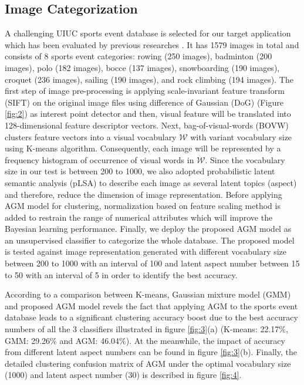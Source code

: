 \documentclass[conference]{IEEEtran}
\begin{document}
\subsection{Image Categorization}
%




A challenging UIUC sports event database\cite{Li2007} is selected for our target application which has been evaluated by previous researches \cite{Najar2018} \cite{Fan2011a}. It has 1579 images in total and consists of 8 sports event categories: rowing (250 images), badminton (200 images), polo (182 images), bocce (137 images), snowboarding (190 images), croquet (236 images), sailing (190 images), and rock climbing (194 images). The first step of image pre-processing is applying scale-invariant feature transform (SIFT) on the original image files using difference of Gaussian (DoG) \cite{Lowe1999} (Figure \ref{fig:2}) as interest point detector and then, visual feature will be translated into 128-dimensional feature descriptor vectors. Next, bag-of-visual-words (BOVW) \cite{Csurka2004} clusters feature vectors into a visual vocabulary $\mathcal{W}$ with variant vocabulary size using K-means algorithm. Consequently, each image will be represented by a frequency histogram of occurrence of visual words in $\mathcal{W}$. Since the vocabulary size in our test is between 200 to 1000, we also adopted probabilistic latent semantic analysis (pLSA) to describe each image as several latent topics (aspect) and therefore, reduce the dimension of image representation. Before applying AGM model for clustering, normalization based on feature scaling method is added to restrain the range of numerical attributes which will improve the Bayesian learning performance. Finally, we deploy the proposed AGM model as an unsupervised classifier to categorize the whole database. The proposed model is tested against image representation generated with different vocabulary size between 200 to 1000 with an interval of 100 and latent aspect number between 15 to 50 with an interval of 5 in order to identify the best accuracy.

According to a comparison between K-means, Gaussian mixture model (GMM) and proposed AGM model revels the fact that applying AGM to the sports event database leads to a significant clustering accuracy boost due to the best accuracy numbers of all the 3 classifiers illustrated in figure \ref{fig:3}(a) (K-means: 22.17\%, GMM: 29.26\% and AGM: 46.04\%). At the meanwhile, the impact of accuracy from different latent aspect numbers can be found in figure \ref{fig:3}(b).  Finally, the detailed clustering confusion matrix of AGM under the optimal vocabulary size (1000) and latent aspect number (30) is described in figure \ref{fig:4}.
\end{document}
